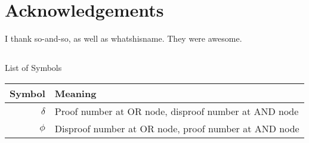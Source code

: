 \documentclass[12pt, letterpaper]{report}
\numberwithin{equation}{section}
\begin{document}
  \newpage 
   \chapter*{Acknowledgements}
   \thispagestyle{empty}
   \vspace*{-0.7in}
   \small{
  I thank so-and-so, as well as whatshisname. They were awesome.
  }
  
  \newpage
  \normalsize
  \tableofcontents 
  
  \newpage
  \listoffigures

  \newpage  
  \listoftables
  
  \newpage
  \thispagestyle{empty}
  \section*{}
  \begin{flushright}
    \huge{List of Symbols}
  \end{flushright}
  \vspace{0.4in}
  \begin{center}
    \begin{tabular}{rl}
      Symbol & Meaning\\
      \hline
      $\delta$       & Proof number at OR node, disproof number at AND node \\
      $\phi$         & Disproof number at OR node, proof number at AND node \\
    \end{tabular}
  \end{center}
  
  \newpage
  \thispagestyle{empty}
\end{document}
